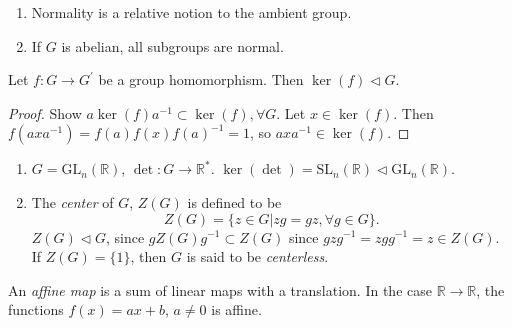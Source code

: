 \begin{remark}
\begin{enumerate}
  \item{Normality is a relative notion to the ambient group.}
  \item{If $G$ is abelian, all subgroups are normal.}
\end{enumerate}
\end{remark}

\begin{prop}
Let $f : G \to G^\prime$ be a group homomorphism. Then
$\ker(f) \triangleleft G$.
\end{prop}
\begin{proof}
Show $a \ker(f) a^{-1} \subset \ker(f), \forall G$.
Let $x \in \ker(f).$ Then
$f(a x a^{-1}) = f(a) f(x) f(a)^{-1} = 1$, so
$a x a^{-1} \in \ker(f)$.
\end{proof}

\begin{xmpl}
\begin{enumerate}
  \item{$G = \mathrm{\mathrm{GL}}_n(\mathbb{R})$, $\det : G \to \mathbb{R}^\ast$.
        $\ker(\det) = \mathrm{SL}_n(\mathbb{R})
                    \triangleleft \mathrm{\mathrm{GL}}_n(\mathbb{R})$.
       }
  \item{The \emph{center} of $G$, $Z(G)$ is defined to be
        $$
        Z(G) = \{ z \in G | z g = g z, \forall g \in G \}.
        $$
        $Z(G) \triangleleft G$, since $g Z(G) g^{-1} \subset Z(G)$
        since $g z g^{-1} = z g g^{-1} = z \in Z(G)$. If
        $Z(G) = \{1\}$, then $G$ is said to be \emph{centerless}.
        }
\end{enumerate}
\end{xmpl}


\begin{defn}
An \emph{affine map} is a sum of linear maps with a translation. In
the case $\mathbb{R} \to \mathbb{R}$, the functions $f(x) = ax + b$,
$a \neq 0$ is affine.
\end{defn}

